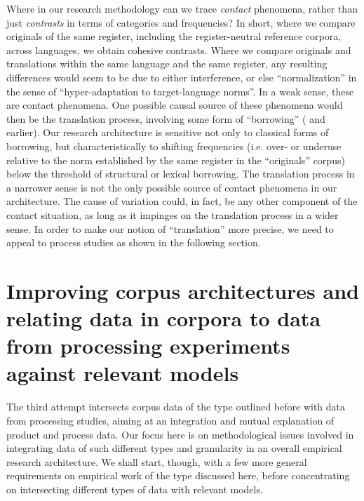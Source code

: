 \documentclass[output=paper]{LSP/langsci}
\begin{document}
\begin{exe}
\begin{exe}
\begin{exe}
\begin{exe}
\begin{exe}
Where in our research methodology can we trace \textit{contact} phenomena, rather than just \textit{contrasts} in terms of categories and frequencies? In short, where we compare originals of the same register, including the register-neutral reference corpora, across languages, we obtain cohesive contrasts. Where we compare originals and translations within the same language and the same register, any resulting differences would seem to be due to either interference, or else ``normalization'' in the sense of ``hyper-adaptation to target-language norms''. In a weak sense, these are contact phenomena. One possible causal source of these phenomena would then be the translation process, involving some form of ``borrowing'' (\citealt[70ff]{Thomason2001} and earlier). Our research architecture is sensitive not only to classical forms of borrowing, but characteristically to shifting frequencies (i.e. over- or underuse relative to the norm established by the same register in the ``originals'' corpus) below the threshold of structural or lexical borrowing. The translation process in a narrower sense is not the only possible source of contact phenomena in our architecture. The cause of variation could, in fact, be any other component of the contact situation, as long as it impinges on the translation process in a wider sense. In order to make our notion of ``translation'' more precise, we need to appeal to process studies as shown in the following section.

\section{Improving corpus architectures and relating data in corpora to data from processing experiments against relevant models}\label{sec:steiner:4}

The third attempt intersects corpus data of the type outlined before with data from processing studies, aiming at an integration and mutual explanation of product and process data. Our focus here is on methodological issues involved in integrating data of such different types and granularity in an overall empirical research architecture. We shall start, though, with a few more general requirements on empirical work of the type discussed here, before concentrating on intersecting different types of data with relevant models.


\end{exe}
\end{exe}
\end{exe}
\end{exe}
\end{exe}
\end{document}
